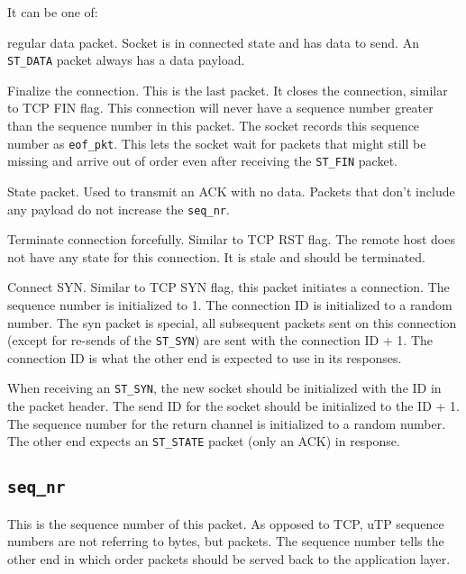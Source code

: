 \documentclass[11pt,a4paper,oneside,draft]{article}
\begin{document}
It can be one of:
{\begin{itemize}
  {\item[${\tt ST\_DATA} = 0$]
    regular data packet. Socket is in connected state and has data to send. An {\tt ST\_DATA} packet always has a data payload.
  }
  {\item[${\tt ST\_FIN} = 1$]
    Finalize the connection. This is the last packet. It closes the connection, similar to TCP FIN flag. This connection will never have a sequence number greater than the sequence number in this packet. The socket records this sequence number as {\tt eof\_pkt}. This lets the socket wait for packets that might still be missing and arrive out of order even after receiving the {\tt ST\_FIN} packet.
  }
  {\item[${\tt ST\_STATE} = 2$]
    State packet. Used to transmit an ACK with no data. Packets that don't include any payload do not increase the {\tt seq\_nr}.
  }
  {\item[${\tt ST\_RESET} = 3$]
    Terminate connection forcefully. Similar to TCP RST flag. The remote host does not have any state for this connection. It is stale and should be terminated.
  }
  {\item[${\tt ST\_SYN} = 4$]
    Connect SYN. Similar to TCP SYN flag, this packet initiates a connection. The sequence number is initialized to 1. The connection ID is initialized to a random number. The syn packet is special, all subsequent packets sent on this connection (except for re-sends of the {\tt ST\_SYN}) are sent with the connection ID + 1. The connection ID is what the other end is expected to use in its responses.
    
    When receiving an {\tt ST\_SYN}, the new socket should be initialized with the ID in the packet header. The send ID for the socket should be initialized to the ID + 1. The sequence number for the return channel is initialized to a random number. The other end expects an {\tt ST\_STATE} packet (only an ACK) in response.
  }
\end{itemize}}

{\subsection {{\tt seq\_nr}}}

This is the sequence number of this packet. As opposed to TCP, uTP sequence numbers are not referring to bytes, but packets. The sequence number tells the other end in which order packets should be served back to the application layer.
\end{document}
